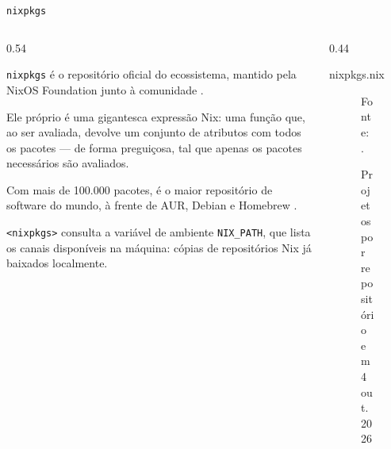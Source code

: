 \documentclass{beamer}
\newcommand{\code}[1]{\texttt{#1}}
\newlength{\nixcodelift}\setlength{\nixcodelift}{7pt}
\newcommand{\nixcode}[2]{\vspace*{-\nixcodelift}\begin{nixbox}{#2}\end{nixbox}}
\begin{document}
\begin{frame}{\code{nixpkgs}}
	\begin{columns}[T,onlytextwidth]
		\begin{column}{0.54\textwidth}
			\small\raggedright
			\code{nixpkgs} é o repositório oficial do ecossistema, mantido pela NixOS Foundation junto à comunidade \cite{nixpkgs-manual}.

			\smallskip

			Ele próprio é uma gigantesca expressão Nix: uma função que, ao ser avaliada, devolve um conjunto de atributos com todos os pacotes --- de forma preguiçosa, tal que apenas os pacotes necessários são avaliados.

			\smallskip
			
			Com mais de 100.000 pacotes, é o maior repositório de software do mundo, à frente de AUR, Debian e Homebrew \cite{repology}.

			\smallskip

  			\code{<nixpkgs>} consulta a variável de ambiente \code{NIX\_PATH}, que lista os canais disponíveis na máquina: cópias de repositórios Nix já baixados localmente.
		\end{column}

		\begin{column}{0.44\textwidth}
			\nixcode{code/nixpkgs}{nixpkgs.nix}
	
			\begin{figure}
				\centering
				\caption{Projetos por repositório em 4 out.\ 2026}
				\label{fig:repos}
				\vspace{-11pt}
				{\scriptsize Fonte: \textcite{repology}.}
			\end{figure}
		\end{column}

	\end{columns}
\end{frame}
\end{document}
